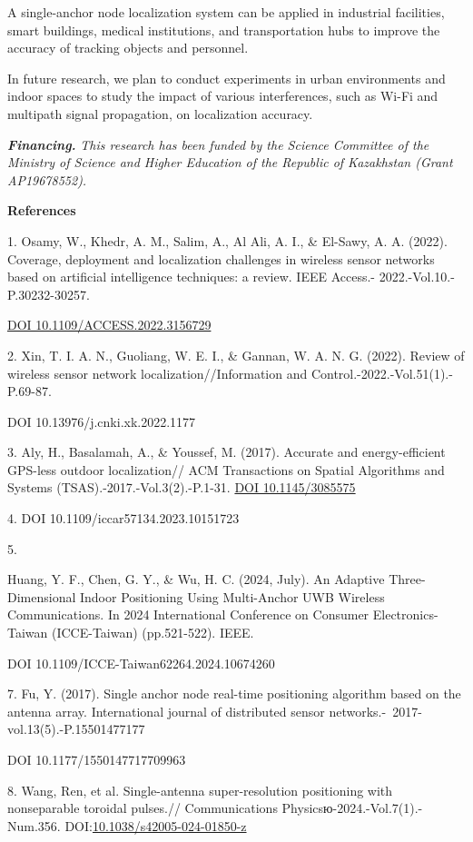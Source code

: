 A single-anchor node localization system can be applied in industrial
facilities, smart buildings, medical institutions, and transportation
hubs to improve the accuracy of tracking objects and personnel.

In future research, we plan to conduct experiments in urban environments
and indoor spaces to study the impact of various interferences, such as
Wi-Fi and multipath signal propagation, on localization accuracy.

\emph{{\bfseries Financing.}} \emph{This research has been funded by the
Science Committee of the Ministry of Science and Higher Education of the
Republic of Kazakhstan (Grant AP19678552).}

{\bfseries References}

1. Osamy, W., Khedr, A. M., Salim, A., Al Ali, A. I., \& El-Sawy, A. A.
(2022). Coverage, deployment and localization challenges in wireless
sensor networks based on artificial intelligence techniques: a review.
IEEE Access.- 2022.-Vol.10.-P.30232-30257.

\href{https://doi.org/10.1109/ACCESS.2022.3156729}{DOI
10.1109/ACCESS.2022.3156729}

2. Xin, T. I. A. N., Guoliang, W. E. I., \& Gannan, W. A. N. G. (2022).
Review of wireless sensor network localization//Information and
Control.-2022.-Vol.51(1).-P.69-87.

DOI 10.13976/j.cnki.xk.2022.1177

3. Aly, H., Basalamah, A., \& Youssef, M. (2017). Accurate and
energy-efficient GPS-less outdoor localization// ACM Transactions on
Spatial Algorithms and Systems (TSAS).-2017.-Vol.3(2).-P.1-31.
\href{https://doi.org/10.1145/3085575}{DOI 10.1145/3085575}

4.  DOI
10.1109/iccar57134.2023.10151723

5. 

Huang, Y. F., Chen, G. Y., \& Wu, H. C. (2024, July). An
Adaptive Three-Dimensional Indoor Positioning Using Multi-Anchor UWB
Wireless Communications. In 2024 International Conference on Consumer
Electronics-Taiwan (ICCE-Taiwan) (pp.521-522). IEEE.

DOI 10.1109/ICCE-Taiwan62264.2024.10674260

7. Fu, Y. (2017). Single anchor node real-time positioning algorithm
based on the antenna array. International journal of distributed sensor
networks.-~2017-vol.13(5).-P.15501477177

DOI 10.1177/1550147717709963

8. Wang, Ren, et al. Single-antenna super-resolution positioning with
nonseparable toroidal pulses.// Communications
Physicsю-2024.-Vol.7(1).-Num.356.
DOI:\href{http://dx.doi.org/10.1038/s42005-024-01850-z}{10.1038/s42005-024-01850-z}

